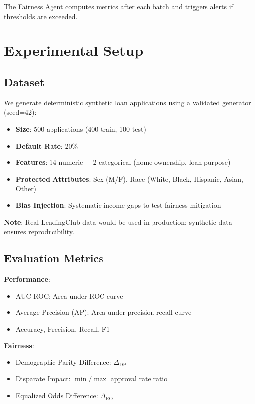 \documentclass[11pt]{article}
\begin{document}
The Fairness Agent computes metrics after each batch and triggers alerts if thresholds are exceeded.

\section{Experimental Setup}

\subsection{Dataset}

We generate deterministic synthetic loan applications using a validated generator (seed=42):

\begin{itemize}
    \item \textbf{Size}: 500 applications (400 train, 100 test)
    \item \textbf{Default Rate}: 20\%
    \item \textbf{Features}: 14 numeric + 2 categorical (home ownership, loan purpose)
    \item \textbf{Protected Attributes}: Sex (M/F), Race (White, Black, Hispanic, Asian, Other)
    \item \textbf{Bias Injection}: Systematic income gaps to test fairness mitigation
\end{itemize}

\textbf{Note}: Real LendingClub data would be used in production; synthetic data ensures reproducibility.

\subsection{Evaluation Metrics}

\textbf{Performance}:
\begin{itemize}
    \item AUC-ROC: Area under ROC curve
    \item Average Precision (AP): Area under precision-recall curve
    \item Accuracy, Precision, Recall, F1
\end{itemize}

\textbf{Fairness}:
\begin{itemize}
    \item Demographic Parity Difference: $\Delta_{\text{DP}}$
    \item Disparate Impact: $\min / \max$ approval rate ratio
    \item Equalized Odds Difference: $\Delta_{\text{EO}}$
\end{itemize}
\end{document}
